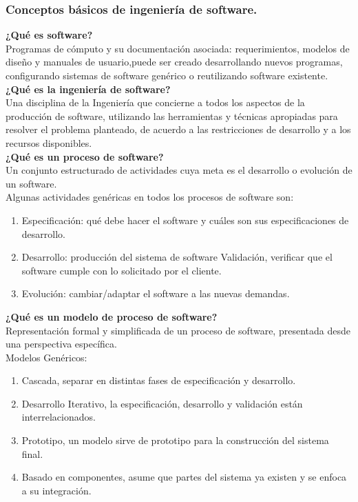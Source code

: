 \documentclass[12pt,twoside]{article}
\begin{document}
\subsubsection{Conceptos b\'asicos de ingenier\'ia de software.}
\textbf{¿Qu\'e es software?}\\
Programas de c\'omputo y su documentaci\'on asociada: requerimientos, modelos de diseño y 
manuales de usuario,puede ser creado desarrollando nuevos programas, configurando 
sistemas de software genérico o reutilizando software existente.\\
\textbf{¿Qu\'e es la ingenier\'ia de software?}\\
Una disciplina de la Ingeniería que concierne a todos los aspectos de la producción de 
software, utilizando las herramientas y técnicas apropiadas para resolver el problema 
planteado, de acuerdo a las restricciones de desarrollo y a los recursos disponibles.\\
\textbf{¿Qu\'e es un proceso de software?}\\
Un conjunto estructurado de actividades cuya meta es el desarrollo o evolución de un 
software.\\
Algunas actividades genéricas en todos los procesos de software son:
\begin{enumerate}
    \item Especificación: qué debe hacer el software y cuáles son sus especificaciones 
    de desarrollo.
    \item Desarrollo: producción del sistema de software Validación, verificar que el 
    software cumple con lo solicitado por el cliente.
    \item Evolución: cambiar/adaptar el software a las nuevas demandas.
\end{enumerate}
\textbf{¿Qué es un modelo de proceso de software?}\\
Representación formal y simplificada de un proceso de software, presentada desde una 
perspectiva específica.\\
Modelos Genéricos:
\begin{enumerate}
    \item Cascada, separar en distintas fases de especificación y desarrollo.
    \item Desarrollo Iterativo, la especificación, desarrollo y validación están 
    interrelacionados.
    \item Prototipo, un modelo sirve de prototipo para la construcción del sistema final.
    \item Basado en componentes, asume que partes del sistema ya existen y se enfoca a su 
    integración.
\end{enumerate}
\end{document}
